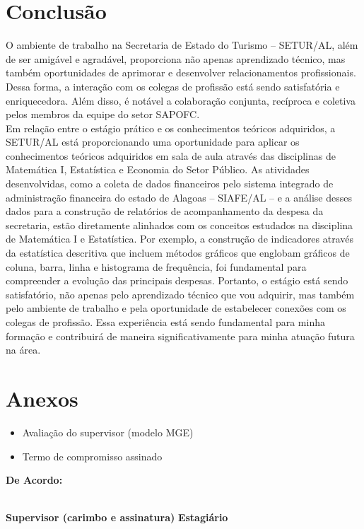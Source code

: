 \documentclass[12pt,a4paper]{article}
\begin{document}
	\section{Conclusão}
	\hspace*{1,5cm}O ambiente de trabalho na Secretaria de Estado do Turismo – SETUR/AL, além de ser 
	amigável e agradável, proporciona não apenas aprendizado técnico, mas também oportunidades 
	de aprimorar e desenvolver relacionamentos profissionais. Dessa forma, a interação com os 
	colegas de profissão está sendo satisfatória e enriquecedora. Além disso, é notável a 
	colaboração conjunta, recíproca e coletiva pelos membros da equipe do setor SAPOFC.\\
	\hspace*{1,5cm}Em relação entre o estágio prático e os conhecimentos teóricos adquiridos, a SETUR/AL 
	está proporcionando uma oportunidade para aplicar os conhecimentos teóricos adquiridos em 
	sala de aula através das disciplinas de Matemática I, Estatística e Economia do Setor Público. 
	As atividades desenvolvidas, como a coleta de dados financeiros pelo sistema integrado de 
	administração financeira do estado de Alagoas – SIAFE/AL – e a análise desses dados para a 
	construção de relatórios de acompanhamento da despesa da secretaria, estão diretamente 
	alinhados com os conceitos estudados na disciplina de Matemática I e Estatística. Por exemplo, 
	a construção de indicadores através da estatística descritiva que incluem métodos gráficos que 
	englobam gráficos de coluna, barra, linha e histograma de frequência, foi fundamental para 
	compreender a evolução das principais despesas. Portanto, o estágio está sendo satisfatório, não 
	apenas pelo aprendizado técnico que vou adquirir, mas também pelo ambiente de trabalho e 
	pela oportunidade de estabelecer conexões com os colegas de profissão. Essa experiência está 
	sendo fundamental para minha formação e contribuirá de maneira significativamente para 
	minha atuação futura na área.
	
	\section{Anexos}
	
	\begin{itemize}
		\item Avaliação do supervisor (modelo MGE)
		\item Termo de compromisso assinado
	\end{itemize}
	
	\vspace{2cm}
	\noindent \textbf{De Acordo:}
	
	\vspace{2cm}
	\noindent \underline{\hspace{7cm}} \hfill \underline{\hspace{7cm}} \\
	\textbf{Supervisor (carimbo e assinatura)} \hfill \textbf{Estagiário}
	
\end{document}

